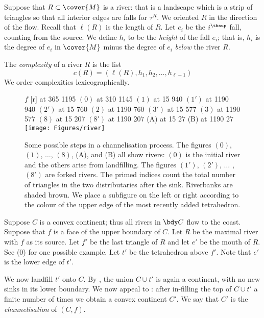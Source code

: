 \documentclass[12pt]{amsart}
\begin{document}
Suppose that $R \subset \cover{M}$ is a river: that is a landscape which is a strip of triangles so that all interior edges are falls for $\tau^R$.  We oriented $R$ in the direction of the flow.  Recall that $\ell(R)$ is the length of $R$.  Let $e_i$ be the $i^\thsup$ fall, counting from the source. We define $h_i$ to be the \emph{height} of the fall $e_i$; that is, $h_i$ is the degree of $e_i$ in $\cover{M}$ minus the degree of $e_i$ \emph{below} the river $R$.  

\begin{definition}
\label{Def:Complexity}
The \emph{complexity} of a river $R$ is the list 
\[
c(R) = (\ell(R), h_1, h_2, \ldots, h_{\ell-1})
\]
We order complexities lexicographically.
\end{definition}

\begin{figure}[htb]
\centering
{}
\small\hair 2pt
\pinlabel $f$ [r] at 365 1195
\pinlabel $(0)$ at 310 1145
\pinlabel $(1)$ at 15 940
\pinlabel $(1')$ at 1190 940
\pinlabel $(2')$ at 15 760
\pinlabel $(2)$ at 1190 760
\pinlabel $(3')$ at 15 577
\pinlabel $(3)$ at 1190 577
\pinlabel $(8)$ at 15 207
\pinlabel $(8')$ at 1190 207
\pinlabel (A) at 15 27
\pinlabel (B) at 1190 27
\endlabellist
\texttt{[image: Figures/river]}
\caption{Some possible steps in a channelisation process. The figures $(0)$, $(1)$, $\ldots$, $(8)$, (A), and (B) all show rivers: $(0)$ is the initial river and the others arise from landfilling.  The figures $(1')$, $(2')$, $\ldots$ , $(8')$ are forked rivers.  The primed indices count the total number of triangles in the two distributaries after the sink.  Riverbanks are shaded brown.  We place a subfigure on the left or right according to the colour of the upper edge of the most recently added tetrahedron.}
\label{Fig:River}
\end{figure}

\begin{definition}
\label{Def:Channelisation}
Suppose $C$ is a convex continent; thus all rivers in $\bdy C$ flow to the coast.  Suppose that $f$ is a face of the upper boundary of $C$. Let $R$ be the maximal river with $f$ as its source.  Let $f'$ be the last triangle of $R$ and let $e'$ be the mouth of $R$. See (0) for one possible example. Let $t'$ be the tetrahedron above $f'$. Note that $e'$ is the lower edge of $t'$. 

We now landfill $t'$ onto $C$.  By , the union $C \cup t'$ is again a continent, with no new sinks in its lower boundary.  We now appeal to : after in-filling the top of $C \cup t'$ a finite number of times we obtain a convex continent $C'$.  We say that $C'$ is the \emph{channelisation} of $(C, f)$. 
\end{definition}
\end{document}
